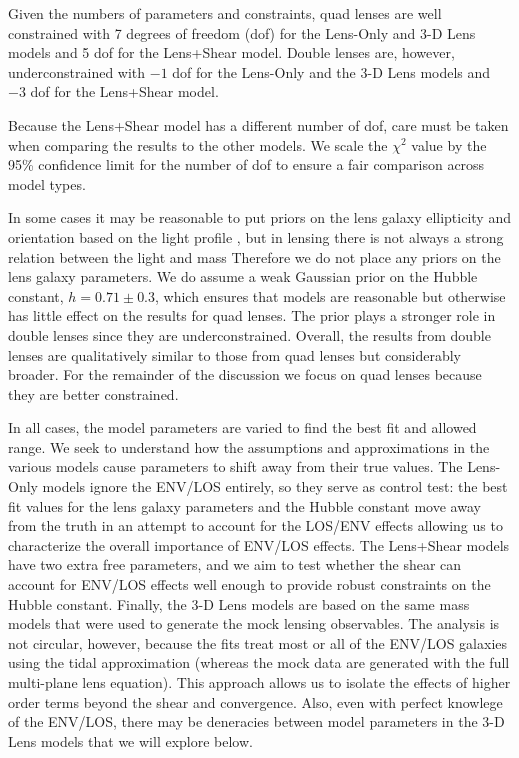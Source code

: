 \documentclass{emulateapj}
\begin{document}
Given the numbers of parameters and constraints, quad lenses are well constrained with 7 degrees of freedom (dof) for the Lens-Only and 3-D Lens models and 5 dof for the Lens+Shear model. Double lenses are, however, underconstrained with $-1$ dof for the Lens-Only and the 3-D Lens models and $-3$ dof for the Lens+Shear model.

Because the Lens+Shear model has a different number of dof, care must be taken when comparing the results to the other models. We scale the $\chi^2$ value by the 95\% confidence limit for the number of dof to ensure a fair comparison across model types.

In some cases it may be reasonable to put priors on the lens galaxy ellipticity and orientation based on the light profile \citep[e.g.,][]{Bolton08}, but in lensing there is not always a strong relation between the light and mass \citep[][and references therein]{Bruderer15}  Therefore we do not place any priors on the lens galaxy parameters.  We do assume a weak Gaussian prior on the Hubble constant, $h = 0.71 \pm 0.3$, which ensures that models are reasonable but otherwise has little effect on the results for quad lenses.  The prior plays a stronger role in double lenses since they are underconstrained.  Overall, the results from double lenses are qualitatively similar to those from quad lenses but considerably broader.  For the remainder of the discussion we focus on quad lenses because they are better constrained.


In all cases, the model parameters are varied to find the best fit and allowed range.  We seek to understand how the assumptions and approximations in the various models cause parameters to shift away from their true values. 
The Lens-Only models ignore the ENV/LOS entirely, so they serve as control test: the best fit values for the lens galaxy parameters and the Hubble constant move away from the truth in an attempt to account for the LOS/ENV effects allowing us to characterize the overall importance of ENV/LOS effects. The Lens+Shear models have two extra free parameters, and we aim to test whether the shear can account for ENV/LOS effects well enough to provide robust constraints on the Hubble constant. Finally, the 3-D Lens models are based on the same mass models that were used to generate the mock lensing observables. The analysis is not circular, however, because the fits treat most or all of the ENV/LOS galaxies using the tidal approximation (whereas the mock data are generated with the full multi-plane lens equation). This approach allows us to isolate the effects of higher order terms beyond the shear and convergence. Also, even with perfect knowlege of the ENV/LOS, there may be deneracies between model parameters in the 3-D Lens models that we will explore below. 
\end{document}
